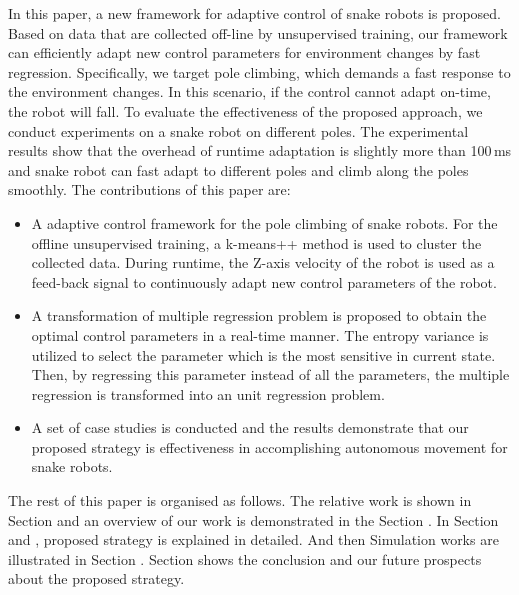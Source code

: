 In this paper, a new framework for adaptive control of snake robots is
proposed. Based on data that are collected off-line by unsupervised
training, our framework can efficiently adapt new control parameters
for environment changes by fast regression. Specifically, we target
pole climbing, which demands a fast response to the environment
changes. In this scenario, if the control cannot adapt on-time, the
robot will fall.  To evaluate the effectiveness of the proposed
approach, we conduct experiments on a snake robot on different
poles. The experimental results show that the overhead of runtime
adaptation is slightly more than 100\,ms and snake robot can fast
adapt to different poles and climb along the poles smoothly. The
contributions of this paper are:
\begin{itemize}
\item A adaptive control framework for the pole climbing of snake
  robots. For the offline unsupervised training, a k-means++ method is
  used to cluster the collected data. During runtime, the Z-axis
  velocity of the robot is used as a feed-back signal to continuously
  adapt new control parameters of the robot.
\item A transformation of multiple regression problem is proposed to
  obtain the optimal control parameters in a real-time manner.  The
  entropy variance is utilized to select the parameter which is the
  most sensitive in current state. Then, by regressing this parameter
  instead of all the parameters, the multiple regression is
  transformed into an unit regression problem.
\item A set of case studies is conducted and the results demonstrate
  that our proposed strategy is effectiveness in accomplishing
  autonomous movement for snake robots.
\end{itemize}

The rest of this paper is organised as follows. The relative work is shown in Section \uppercase\expandafter{} and an overview of our work is
demonstrated in the Section \uppercase\expandafter{}. In
Section \uppercase\expandafter{} and \uppercase\expandafter{}, proposed strategy is
explained in detailed. And then Simulation works are illustrated in
Section \uppercase\expandafter{}. Section
\uppercase\expandafter{} shows the conclusion and our
future prospects about the proposed strategy.